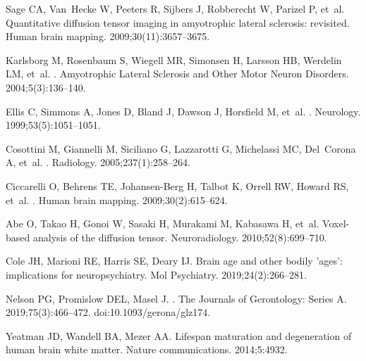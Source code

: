 \documentclass[10pt,letterpaper]{article}
\begin{document}
\begin{thebibliography}{100}
Sage CA, Van~Hecke W, Peeters R, Sijbers J, Robberecht W, Parizel P, et~al.
\newblock Quantitative diffusion tensor imaging in amyotrophic lateral
  sclerosis: revisited.
\newblock Human brain mapping. 2009;30(11):3657--3675.

Karlsborg M, Rosenbaum S, Wiegell MR, Simonsen H, Larsson HB, Werdelin LM,
  et~al.
.
\newblock Amyotrophic Lateral Sclerosis and Other Motor Neuron Disorders.
  2004;5(3):136--140.

Ellis C, Simmons A, Jones D, Bland J, Dawson J, Horsfield M, et~al.
.
\newblock Neurology. 1999;53(5):1051--1051.

Cosottini M, Giannelli M, Siciliano G, Lazzarotti G, Michelassi MC, Del~Corona
  A, et~al.
.
\newblock Radiology. 2005;237(1):258--264.

Ciccarelli O, Behrens TE, Johansen-Berg H, Talbot K, Orrell RW, Howard RS,
  et~al.
.
\newblock Human brain mapping. 2009;30(2):615--624.

Abe O, Takao H, Gonoi W, Sasaki H, Murakami M, Kabasawa H, et~al.
\newblock Voxel-based analysis of the diffusion tensor.
\newblock Neuroradiology. 2010;52(8):699--710.

Cole JH, Marioni RE, Harris SE, Deary IJ.
\newblock Brain age and other bodily 'ages': implications for neuropsychiatry.
\newblock Mol Psychiatry. 2019;24(2):266--281.

Nelson PG, Promislow DEL, Masel J.
.
\newblock The Journals of Gerontology: Series A. 2019;75(3):466--472.
\newblock doi:{10.1093/gerona/glz174}.

Yeatman JD, Wandell BA, Mezer AA.
\newblock Lifespan maturation and degeneration of human brain white matter.
\newblock Nature communications. 2014;5:4932.


\end{thebibliography}
\end{document}
